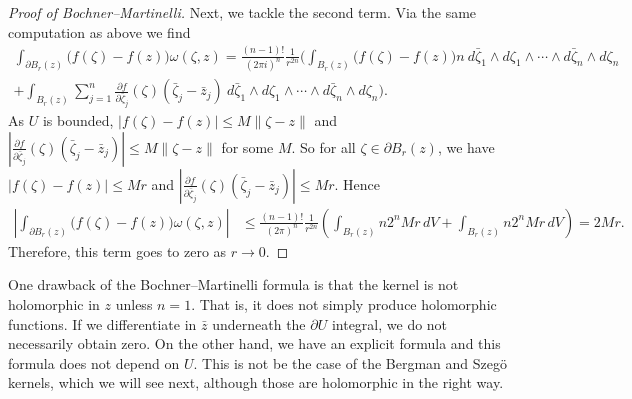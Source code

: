 \documentclass[12pt,openany]{book}
\newcommand{\snorm}[1]{\lVert {#1} \rVert}
\newcommand{\abs}[1]{\left\lvert {#1} \right\rvert}
\theoremstyle{plain}
\theoremstyle{remark}
\theoremstyle{definition}
\theoremstyle{exercise}
\theoremstyle{example}
\begin{document}
\begin{proof}[Proof of Bochner--Martinelli]
Next, we tackle the second term.
Via the same computation as above we find
\begin{multline*}
\int_{\partial B_r(z)}
\bigl(f(\zeta)-f(z)\bigr)
\omega(\zeta,z)
=
\frac{(n-1)!}{{(2\pi i)}^n}\frac{1}{r^{2n}}
\Biggl(
\int_{B_r(z)}
\bigl(f(\zeta)-f(z)\bigr)
n~
d\bar{\zeta}_1 \wedge d\zeta_1 \wedge
\cdots \wedge
d\bar{\zeta}_n \wedge d\zeta_n
\\
+
\int_{B_r(z)}
\sum_{j=1}^n
\frac{\partial f}{\partial \bar{\zeta}_j}(\zeta)
(\bar{\zeta}_j-\bar{z}_j)
~
d\bar{\zeta}_1 \wedge d\zeta_1 \wedge
\cdots \wedge
d\bar{\zeta}_n \wedge d\zeta_n \Biggr).
\end{multline*}
As $U$ is bounded, $\abs{f(\zeta)-f(z)} \leq M
\snorm{\zeta-z}$
and
$\abs{\frac{\partial f}{\partial \bar{\zeta}_j}(\zeta)
(\bar{\zeta}_j-\bar{z}_j)} \leq M \snorm{\zeta-z}$ for some $M$.
So 
for all $\zeta \in \partial B_r(z)$,
we have
$\abs{f(\zeta)-f(z)} \leq Mr$
and $\abs{\frac{\partial f}{\partial \bar{\zeta}_j}(\zeta)
(\bar{\zeta}_j-\bar{z}_j)} \leq Mr$.
Hence
\begin{equation*}
\begin{split}
\abs{
\int_{\partial B_r(z)}
\bigl(f(\zeta)-f(z)\bigr)
\omega(\zeta,z)
}
& \leq
\frac{(n-1)!}{{(2\pi)}^n}\frac{1}{r^{2n}}
\left(
\int_{B_r(z)}
n 2^n Mr \, dV
+
\int_{B_r(z)}
n 2^n Mr \, dV
\right)
=
2 M r .
\end{split}
\end{equation*}
Therefore, this term goes to zero as $r \to 0$.
\end{proof}

One drawback of the Bochner--Martinelli formula is that the kernel is not
holomorphic in $z$ unless $n=1$.  That is, it does not simply produce
holomorphic functions.  If we differentiate in $\bar{z}$ underneath the
$\partial U$ integral, we do not necessarily obtain zero.
On the other hand, we have an explicit formula and this formula does not
depend on $U$.  This is not be the case of the Bergman and Szeg\"o
kernels, which we will see next, although those are holomorphic in the
right way.
\end{document}
